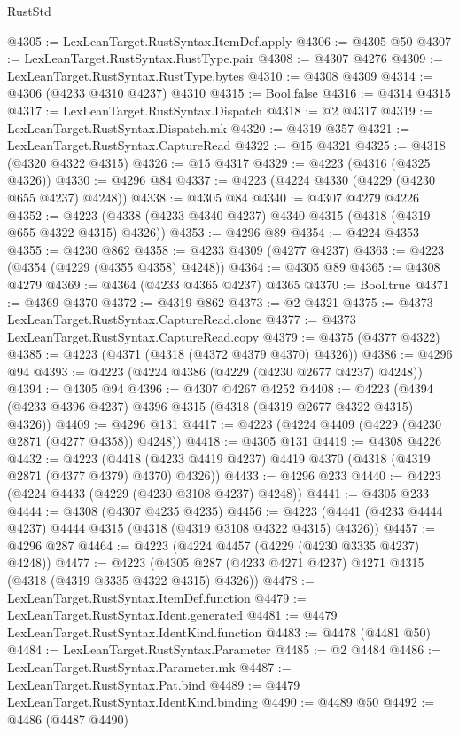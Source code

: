 \begin{lexlean}{RustStd}
\begin{coremodule}
@4305 := LexLeanTarget.RustSyntax.ItemDef.apply
@4306 := @4305 @50
@4307 := LexLeanTarget.RustSyntax.RustType.pair
@4308 := @4307 @4276
@4309 := LexLeanTarget.RustSyntax.RustType.bytes
@4310 := @4308 @4309
@4314 := @4306 (@4233 @4310 @4237) @4310
@4315 := Bool.false
@4316 := @4314 @4315
@4317 := LexLeanTarget.RustSyntax.Dispatch
@4318 := @2 @4317
@4319 := LexLeanTarget.RustSyntax.Dispatch.mk
@4320 := @4319 @357
@4321 := LexLeanTarget.RustSyntax.CaptureRead
@4322 := @15 @4321
@4325 := @4318 (@4320 @4322 @4315)
@4326 := @15 @4317
@4329 := @4223 (@4316 (@4325 @4326))
@4330 := @4296 @84
@4337 := @4223 (@4224 @4330 (@4229 (@4230 @655 @4237) @4248))
@4338 := @4305 @84
@4340 := @4307 @4279 @4226
@4352 := @4223 (@4338 (@4233 @4340 @4237) @4340 @4315 (@4318 (@4319 @655 @4322 @4315) @4326))
@4353 := @4296 @89
@4354 := @4224 @4353
@4355 := @4230 @862
@4358 := @4233 @4309 (@4277 @4237)
@4363 := @4223 (@4354 (@4229 (@4355 @4358) @4248))
@4364 := @4305 @89
@4365 := @4308 @4279
@4369 := @4364 (@4233 @4365 @4237) @4365
@4370 := Bool.true
@4371 := @4369 @4370
@4372 := @4319 @862
@4373 := @2 @4321
@4375 := @4373 LexLeanTarget.RustSyntax.CaptureRead.clone
@4377 := @4373 LexLeanTarget.RustSyntax.CaptureRead.copy
@4379 := @4375 (@4377 @4322)
@4385 := @4223 (@4371 (@4318 (@4372 @4379 @4370) @4326))
@4386 := @4296 @94
@4393 := @4223 (@4224 @4386 (@4229 (@4230 @2677 @4237) @4248))
@4394 := @4305 @94
@4396 := @4307 @4267 @4252
@4408 := @4223 (@4394 (@4233 @4396 @4237) @4396 @4315 (@4318 (@4319 @2677 @4322 @4315) @4326))
@4409 := @4296 @131
@4417 := @4223 (@4224 @4409 (@4229 (@4230 @2871 (@4277 @4358)) @4248))
@4418 := @4305 @131
@4419 := @4308 @4226
@4432 := @4223
    (@4418 (@4233 @4419 @4237) @4419 @4370 (@4318 (@4319 @2871 (@4377 @4379) @4370) @4326))
@4433 := @4296 @233
@4440 := @4223 (@4224 @4433 (@4229 (@4230 @3108 @4237) @4248))
@4441 := @4305 @233
@4444 := @4308 (@4307 @4235 @4235)
@4456 := @4223 (@4441 (@4233 @4444 @4237) @4444 @4315 (@4318 (@4319 @3108 @4322 @4315) @4326))
@4457 := @4296 @287
@4464 := @4223 (@4224 @4457 (@4229 (@4230 @3335 @4237) @4248))
@4477 := @4223 (@4305 @287 (@4233 @4271 @4237) @4271 @4315 (@4318 (@4319 @3335 @4322 @4315) @4326))
@4478 := LexLeanTarget.RustSyntax.ItemDef.function
@4479 := LexLeanTarget.RustSyntax.Ident.generated
@4481 := @4479 LexLeanTarget.RustSyntax.IdentKind.function
@4483 := @4478 (@4481 @50)
@4484 := LexLeanTarget.RustSyntax.Parameter
@4485 := @2 @4484
@4486 := LexLeanTarget.RustSyntax.Parameter.mk
@4487 := LexLeanTarget.RustSyntax.Pat.bind
@4489 := @4479 LexLeanTarget.RustSyntax.IdentKind.binding
@4490 := @4489 @50
@4492 := @4486 (@4487 @4490)

\end{coremodule}
\end{lexlean}
